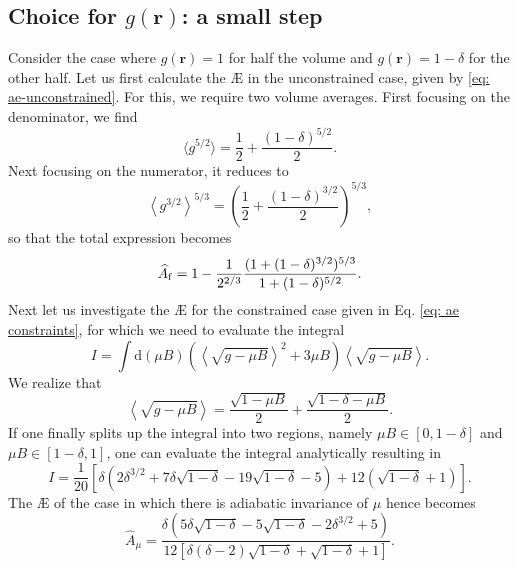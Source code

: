 \subsection*{Choice for $g(\boldsymbol{r})$: a small step}
Consider the case where $g(\boldsymbol{r})=1$ for half the volume and $g(\boldsymbol{r})=1 - \delta$ for the other half. Let us first calculate the \AE{} in the unconstrained case, given by \eqref{eq: ae-unconstrained}. For this, we require two volume averages. First focusing on the denominator, we find
\begin{equation}
    \langle g^{5/2} \rangle = \frac{1}{2} + \frac{(1-\delta)^{5/2}}{2}.
\end{equation}
Next focusing on the numerator, it reduces to
\begin{equation}
    \left\langle g^{3/2} \right\rangle^{5/3} = \left( \frac{1}{2} + \frac{(1 - \delta)^{3/2}}{2} \right)^{5/3},
\end{equation}
so that the total expression becomes
\begin{equation}
    \widehat{A}_{\rm f} = 1 - \frac{1}{2^{2/3}} \frac{(1 + (1 - \delta)^{3/2})^{5/3}}{1+(1-\delta)^{5/2}}.
\end{equation}
Next let us investigate the \AE{} for the constrained case given in Eq. \eqref{eq: ae constraints}, for which we need to evaluate the integral
\begin{equation}
    I=\int \mathrm{d}(\mu B) \left(\left\langle \sqrt{ g - \mu B} \right\rangle^2 + 3 \mu B \right) \left\langle \sqrt{ g - \mu B} \right\rangle.
\end{equation}
We realize that
\begin{equation}
    \left\langle \sqrt{ g - \mu B} \right\rangle = \frac{\sqrt{1 - \mu B}}{2} + \frac{\sqrt{1-\delta - \mu B}}{2}.
\end{equation}
If one finally splits up the integral into two regions, namely $\mu B \in [0,1-\delta] $ and $\mu B \in [1- \delta,1]$, one can evaluate the integral analytically resulting in
\begin{equation}
    I=\frac{1}{20} \left[\delta  \left(2 \delta ^{3/2}+7\delta \sqrt{1-\delta }  -19
   \sqrt{1-\delta }-5\right)+12 \left(\sqrt{1-\delta }+1\right)\right].
\end{equation}
The \AE{} of the case in which there is adiabatic invariance of $\mu$ hence becomes
\begin{equation}
    \widehat{A}_\mu = \frac{\delta  \left(5  \delta \sqrt{1-\delta } -5
   \sqrt{1-\delta } -2 \delta ^{3/2}+5\right)}{12 \left[\delta(\delta -2)\sqrt{1-\delta }
   +\sqrt{1-\delta }+1\right]}.
\end{equation}
